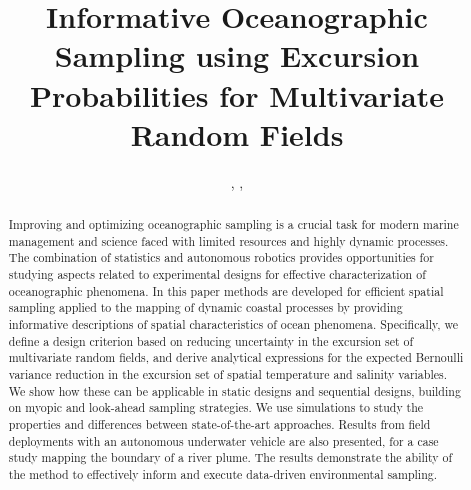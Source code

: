 \documentclass[aoas]{imsart}
\begin{document}
\begin{frontmatter}

\title{Informative Oceanographic Sampling using Excursion Probabilities for Multivariate Random Fields}


\author{ ,  ,     \and {} }

\address{Department of Marine Technology\\ Trondheim, Norway}

\address{Department of Mathematical Sciences }

\address{Idiap }

\address{Department of Engineering Cybernetics,}


\begin{abstract}
Improving and optimizing oceanographic sampling is a crucial task for modern marine management and science faced with limited resources and highly dynamic processes. The combination of statistics and autonomous robotics provides opportunities for studying aspects related to experimental designs for effective characterization of oceanographic phenomena. In this paper methods are developed for efficient spatial sampling applied to the mapping of dynamic coastal processes by providing informative descriptions of spatial characteristics of ocean phenomena. Specifically, we define a design criterion based on reducing uncertainty in the excursion set of multivariate random fields, and derive analytical expressions for the expected Bernoulli variance reduction in the excursion set of spatial temperature and salinity variables. We show how these can be applicable in static designs and sequential designs, building on myopic and look-ahead sampling strategies. We use simulations to study the properties and differences between state-of-the-art approaches. Results from field deployments with an autonomous underwater vehicle are also presented, for a case study mapping the boundary of a river plume. The results demonstrate the ability of the method to effectively inform and execute data-driven environmental sampling.  


\end{abstract}
\end{frontmatter}
\end{document}
